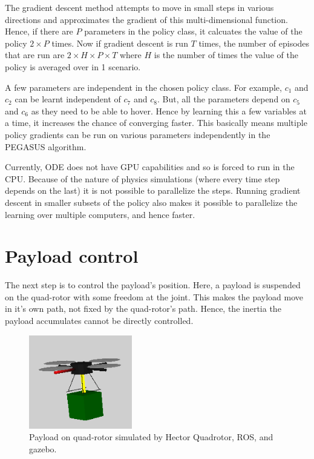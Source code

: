 \documentclass[hidelinks,BTech]{iitmdiss}
\begin{document}
The gradient descent method attempts to move in small steps in various directions and approximates the gradient of this multi-dimensional function. Hence, if there are $P$ parameters in the policy class, it calcuates the value of the policy $2 \times P$ times. Now if gradient descent is run $T$ times, the number of episodes that are run are $2 \times H \times P \times T$ where $H$ is the number of times the value of the policy is averaged over in 1 scenario.

A few parameters are independent in the chosen policy class. For example, $c_1$ and $c_2$ can be learnt independent of $c_7$ and $c_8$. But, all the parameters depend on $c_5$ and $c_6$ as they need to be able to hover. Hence by learning this a few variables at a time, it increases the chance of converging faster. This basically means multiple policy gradients can be run on various parameters independently in the PEGASUS algorithm.

Currently, ODE does not have GPU capabilities and so is forced to run in the CPU. Because of the nature of physics simulations (where every time step depends on the last) it is not possible to parallelize the steps. Running gradient descent in smaller subsets of the policy also makes it possible to parallelize the learning over multiple computers, and hence faster.

\section{Payload control}

The next step is to control the payload's position. Here, a payload is suspended on the quad-rotor with some freedom at the joint. This makes the payload move in it's own path, not fixed by the quad-rotor's path. Hence, the inertia the payload accumulates cannot be directly controlled.

\begin{figure}[H]
  \centering
    \includegraphics[width=0.4\textwidth]{payload_sim.png}
    \caption{Payload on quad-rotor simulated by Hector Quadrotor, ROS, and gazebo.}
\end{figure}
\end{document}

